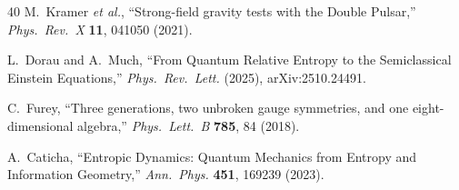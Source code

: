 \documentclass[prl,twocolumn,superscriptaddress,longbibliography]{revtex4-2}
\begin{document}
\begin{thebibliography}{40}
M.~Kramer \textit{et al.},
``Strong-field gravity tests with the Double Pulsar,''
\textit{Phys.\ Rev.\ X} \textbf{11}, 041050 (2021).


L.~Dorau and A.~Much,
``From Quantum Relative Entropy to the Semiclassical Einstein
Equations,''
\textit{Phys.\ Rev.\ Lett.} (2025), arXiv:2510.24491.


C.~Furey,
``Three generations, two unbroken gauge symmetries, and one
eight-dimensional algebra,''
\textit{Phys.\ Lett.\ B} \textbf{785}, 84 (2018).


A.~Caticha,
``Entropic Dynamics: Quantum Mechanics from Entropy and
Information Geometry,''
\textit{Ann.\ Phys.} \textbf{451}, 169239 (2023).

\end{thebibliography}
\end{document}
